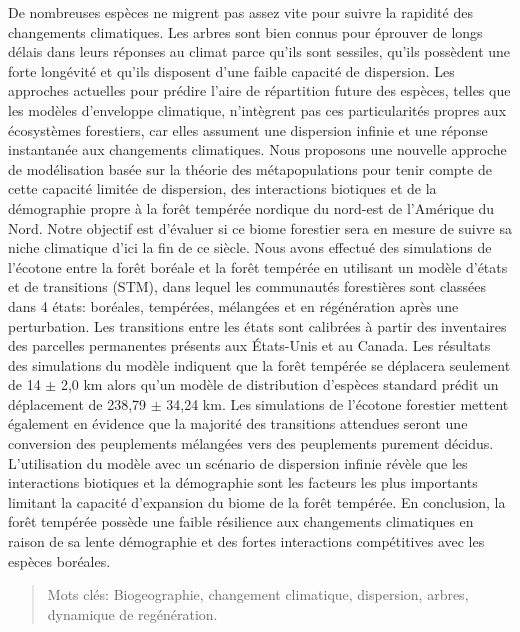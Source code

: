 \resume
\begin{singlespace}

  De nombreuses espèces ne migrent pas assez vite pour suivre la rapidité des changements climatiques. Les arbres sont bien connus pour éprouver de longs délais dans leurs réponses au climat parce qu'ils sont sessiles, qu'ils possèdent une forte longévité et qu'ils disposent d'une faible capacité de dispersion. Les approches actuelles pour prédire l'aire de répartition future des espèces, telles que les modèles d'enveloppe climatique, n'intègrent pas ces particularités propres aux écosystèmes forestiers, car elles assument une dispersion infinie et une réponse instantanée aux changements climatiques. Nous proposons une nouvelle approche de modélisation basée sur la théorie des métapopulations pour tenir compte de cette capacité limitée de dispersion, des interactions biotiques et de la démographie propre à la forêt tempérée nordique du nord-est de l'Amérique du Nord. Notre objectif est d'évaluer si ce biome forestier sera en mesure de suivre sa niche climatique d'ici la fin de ce siècle. Nous avons effectué des simulations de l'écotone entre la forêt boréale et la forêt tempérée en utilisant un modèle d'états et de transitions (STM), dans lequel les communautés forestières sont classées dans 4 états: boréales, tempérées, mélangées et en régénération après une perturbation. Les transitions entre les états sont calibrées à partir des inventaires des parcelles permanentes présents aux États-Unis et au Canada. Les résultats des simulations du modèle indiquent que la forêt tempérée se déplacera seulement de 14 $\pm$ 2,0 km alors qu'un modèle de distribution d'espèces standard prédit un déplacement de 238,79 $\pm$ 34,24 km. Les simulations de l'écotone forestier mettent également en évidence que la majorité des transitions attendues seront une conversion des peuplements mélangées vers des peuplements purement décidus. L'utilisation du modèle avec un scénario de dispersion infinie révèle que les interactions biotiques et la démographie sont les facteurs les plus importants limitant la capacité d'expansion du biome de la forêt tempérée. En conclusion, la forêt tempérée possède une faible résilience aux changements climatiques en raison de sa lente démographie et des fortes interactions compétitives avec les espèces boréales.

  \begin{quote}
    Mots clés: Biogeographie, changement climatique, dispersion, arbres, dynamique de regénération.
  \end{quote}
\end{singlespace}
\cleardoublepage

